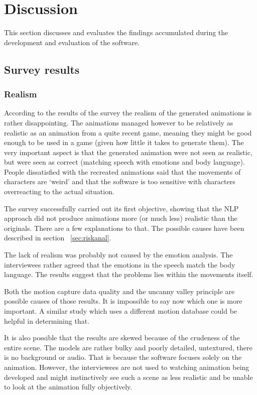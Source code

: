 \chapter{Discussion \label{chap:discussion}}
This section discusses and evaluates the findings accumulated during the development and evaluation of the software.

\section{Survey results}

\subsection{Realism}
According to the results of the survey the realism of the generated animations is rather disappointing. The animations managed however to be relatively as realistic as an animation from a quite recent game, meaning they might be good enough to be used in a game (given how little it takes to generate them). The very important aspect is that the generated animation were not seen as realistic, but were seen as correct (matching speech with emotions and body language). People dissatisfied with the recreated animations said that the movements of characters are `weird' and that the software is too sensitive with characters overreacting to the actual situation. 

The survey successfully carried out its first objective, showing that the NLP approach did not produce animations more (or much less) realistic than the originals. There are a few explanations to that. The possible causes have been described in section ~\ref{sec:riskanal}.

The lack of realism was probably not caused by the emotion analysis. The interviewees rather agreed that the emotions in the speech match the body language. The results suggest that the problems lies within the movements itself. 

Both the motion capture data quality and the uncanny valley principle are possible causes of those results. It is impossible to say now which one is more important. A similar study which uses a different motion database could be helpful in determining that.

It is also possible that the results are skewed because of the crudeness of the entire scene. The models are rather bulky and poorly detailed, untextured, there is no background or audio. That is because the software focuses solely on the animation. However, the interviewees are not used to watching animation being developed and might instinctively see such a scene as less realistic and be unable to look at the animation fully objectively. 

